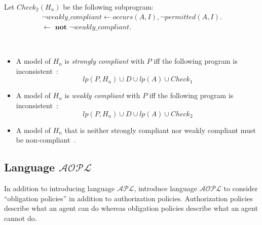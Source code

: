 Let $Check_2(H_n)$ be the following subprogram:
\begin{gather*}
    \neg weakly\_compliant \leftarrow occurs(A, I), \neg permitted(A, I). \\
    \leftarrow \textbf{ not } \neg weakly\_compliant.
\end{gather*}

\begin{definition}
    \label{def:authorization_event_compliance_history_knowledge}
    ~

    \begin{itemize}
        \item A model of $H_n$ is \textit{strongly compliant} with $P$ iff the following program is inconsistent~\citep{gelfond_authorization_2008}:
            \[
                lp(P, H_n) \cup D \cup lp(A) \cup Check_1
            \]
        \item A model of $H_n$ is \textit{weakly compliant} with $P$ iff the following program is inconsistent~\citep{gelfond_authorization_2008}:
            \[
                lp(P, H_n) \cup D \cup lp(A) \cup Check_2
            \]
        \item A model of $H_n$ that is neither strongly compliant nor weakly compliant must be non-compliant~\citep{gelfond_authorization_2008}.
    \end{itemize}
\end{definition}



%






\subsection{Language $\mathcal{AOPL}$}

In addition to introducing language $\mathcal{APL}$, \citet{gelfond_authorization_2008} introduce language $\mathcal{AOPL}$ to consider ``obligation policies'' in addition to authorization policies.
Authorization policies describe what an agent can do whereas obligation policies describe what an agent cannot do.

